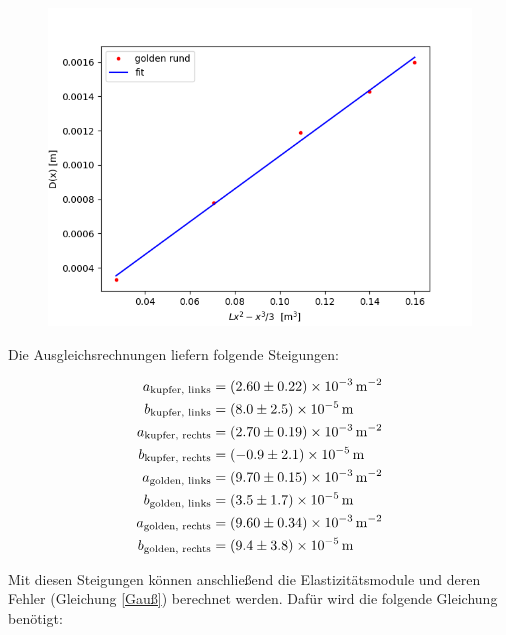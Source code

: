 \begin{figure}[H]
    \centering
    \includegraphics{grb2.png}
\end{figure}

\noindent Die Ausgleichsrechnungen liefern folgende Steigungen:

\begin{align*}
    a_\text{kupfer, links} &= \SI[separate-uncertainty=true]{2.60(0.22)E-3}{\per \square\metre}\\
    b_\text{kupfer, links} &= \SI[separate-uncertainty=true]{8.0(2.5)E-5}{\metre}\\
    a_\text{kupfer, rechts} &= \SI[separate-uncertainty=true]{2.70(0.19)E-3}{\per \square\metre}\\
    b_\text{kupfer, rechts} &= \SI[separate-uncertainty=true]{-0.9(2.1)E-5}{\metre}\\
    a_\text{golden, links} &= \SI[separate-uncertainty=true]{9.70(0.15)E-3}{\per \square\metre}\\
    b_\text{golden, links} &= \SI[separate-uncertainty=true]{3.5(1.7)E-5}{\metre}\\
    a_\text{golden, rechts} &= \SI[separate-uncertainty=true]{9.60(0.34)E-3}{\per \square\metre} \\
    b_\text{golden, rechts} &= \SI[separate-uncertainty=true]{9.4(3.8)E-5}{\metre}\\
\end{align*}

\noindent Mit diesen Steigungen können anschließend die Elastizitätsmodule und deren Fehler (Gleichung \ref{Gauß}) berechnet werden. Dafür wird die folgende Gleichung benötigt:

